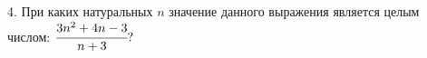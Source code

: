 4. При каких натуральных $n$ значение данного выражения является целым числом: $\cfrac{3n^2+4n-3}{n+3}?$\\
